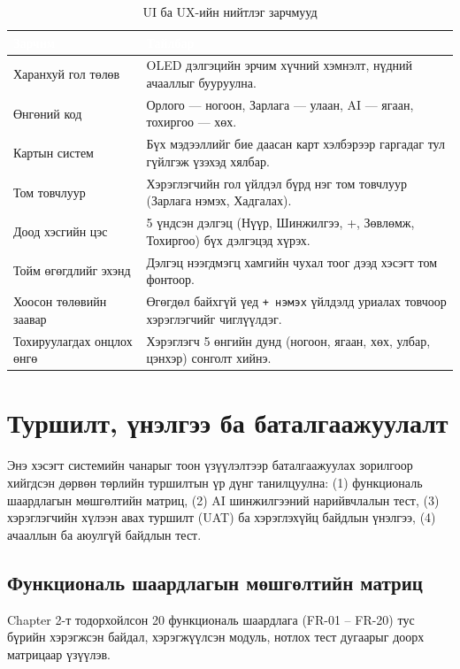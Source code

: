 \begin{table}[ht]
\centering
\footnotesize
\renewcommand{\arraystretch}{1.3}
\begin{tabular}{|p{3.2cm}|p{8.8cm}|}
\hline
\rowcolor{darknavy}
\textcolor{white}{\textbf{Зарчим}} & \textcolor{white}{\textbf{Тайлбар}} \\ \hline
Харанхуй гол төлөв      & OLED дэлгэцийн эрчим хүчний хэмнэлт, нүдний ачааллыг бууруулна. \\ \hline
Өнгөний код             & Орлого --- ногоон, Зарлага --- улаан, AI --- ягаан, тохиргоо --- хөх. \\ \hline
Картын систем           & Бүх мэдээллийг бие даасан карт хэлбэрээр гаргадаг тул гүйлгэж үзэхэд хялбар. \\ \hline
Том товчлуур            & Хэрэглэгчийн гол үйлдэл бүрд нэг том товчлуур (Зарлага нэмэх, Хадгалах). \\ \hline
Доод хэсгийн цэс         & 5 үндсэн дэлгэц (Нүүр, Шинжилгээ, +, Зөвлөмж, Тохиргоо) бүх дэлгэцэд хүрэх. \\ \hline
Тойм өгөгдлийг эхэнд    & Дэлгэц нээгдмэгц хамгийн чухал тоог дээд хэсэгт том фонтоор. \\ \hline
Хоосон төлөвийн заавар   & Өгөгдөл байхгүй үед \texttt{+ нэмэх} үйлдэлд уриалах товчоор хэрэглэгчийг чиглүүлдэг. \\ \hline
Тохируулагдах онцлох өнгө & Хэрэглэгч 5 өнгийн дунд (ногоон, ягаан, хөх, улбар, цэнхэр) сонголт хийнэ. \\ \hline
\end{tabular}
\caption{UI ба UX-ийн нийтлэг зарчмууд}
\label{tab:ux-rules}
\end{table}

\section{Туршилт, үнэлгээ ба баталгаажуулалт}
Энэ хэсэгт системийн чанарыг тоон үзүүлэлтээр баталгаажуулах зорилгоор хийгдсэн дөрвөн төрлийн туршилтын үр дүнг танилцуулна: (1) функциональ шаардлагын мөшгөлтийн матриц, (2) AI шинжилгээний нарийвчлалын тест, (3) хэрэглэгчийн хүлээн авах туршилт (UAT) ба хэрэглэхүйц байдлын үнэлгээ, (4) ачааллын ба аюулгүй байдлын тест.

\subsection{Функциональ шаардлагын мөшгөлтийн матриц}
Chapter 2-т тодорхойлсон 20 функциональ шаардлага (FR-01 -- FR-20) тус бүрийн хэрэгжсэн байдал, хэрэгжүүлсэн модуль, нотлох тест дугаарыг доорх матрицаар үзүүлэв.

